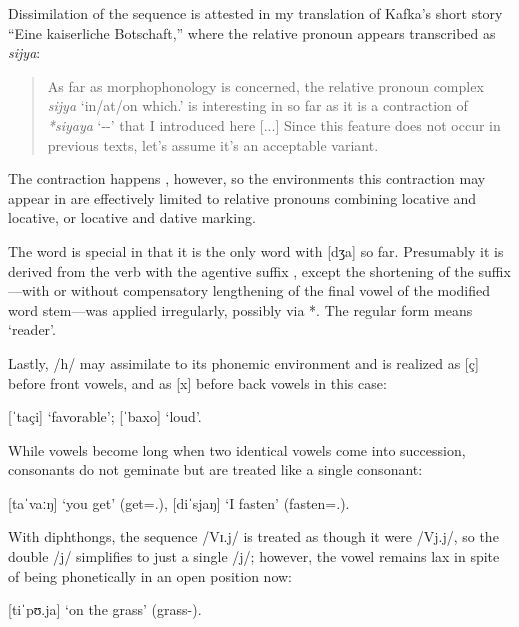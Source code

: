 Dissimilation of the sequence  is attested in my translation 
of Kafka's short story ``Eine kaiserliche Botschaft,'' where the relative 
pronoun  appears transcribed as \textit{sijya}:

\blockcquote[12]{becker:kafka:imperial}{As far as morphophonology is concerned, 
the relative pronoun complex \textit{sijya} `in/at/on which.\Loc{}' is 
interesting in so far as it is a contraction of \textit{*siyaya} 
`\Rel{}-\Loc{}-\Loc{}' that I introduced here [...] Since this feature does not 
occur in previous texts, let's assume it's an acceptable variant.}

\noindent The contraction happens , however, so the environments this 
contraction may appear in are effectively limited to relative pronouns 
combining locative and locative, or locative and dative marking.

The word  is special in that it is the only word 
with  [dʒa] so far. Presumably it is derived from the verb 
 with the agentive suffix , except the 
shortening of the suffix---with or without compensatory lengthening of the final 
vowel of the modified word stem---was applied irregularly, possibly via 
*. The regular form  means `reader'.

Lastly, /h/ may assimilate to its phonemic environment and is realized as 
[ç] before front vowels, and as [x] before back vowels in this case:

\pex
	\a {} [ˈtaçi] `favorable';
	\a {} [ˈbaxo] `loud'.
\xe

While vowels become long when two identical vowels come into succession,  
consonants do not geminate but are treated like a single consonant:

\pex
	\a {} [taˈvaːŋ] `you get' 
		(get=\Ssg{}.\Aarg{}),
	\a {} [diˈsjaŋ] `I fasten' 
		(fasten=\Fsg{}.\Aarg{}).
\xe

With diphthongs, the sequence /Vɪ.j/ is treated as though it 
were /Vj.j/, so the double /j/ simplifies to just a single /j/; however, the 
vowel remains lax in spite of being phonetically in an open position now:

\ex
	 [tiˈpʊ.ja] `on the grass' 
		(grass-\Loc{}).
\xe

